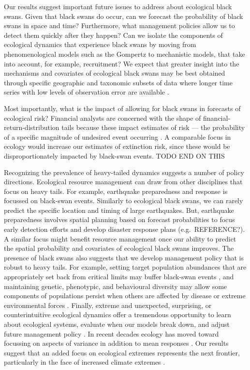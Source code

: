 Our results suggest important future issues to address about ecological black swans. Given that black swans do occur, can we forecast the probability of black swans in space and time? Furthermore, what management policies allow us to detect them quickly after they happen? Can we isolate the components of ecological dynamics that experience black swans by moving from phenomenological models such as the Gompertz to mechanistic models, that take into account, for example, recruitment? We expect that greater insight into the mechanisms and covariates of ecological black swans may be best obtained through specific geographic and taxonomic subsets of data where longer time series with low levels of observation error are available \citep[e.g.][]{segura2013}.

Most importantly, what is the impact of allowing for black swans in forecasts of ecological risk? Financial analysts are concerned with the shape of financial-return-distribution tails because these impact estimates of risk --- the probability of a specific magnitude of undesired event occurring \citep{rachev2008}. A comparable focus in ecology would increase our estimates of extinction risk, since these would be disproportionately impacted by black-swan events.
TODO END ON THIS

Recognizing the prevalence of heavy-tailed dynamics suggests a number of policy directions. Ecological resource management can draw from other disciplines that focus on heavy tails. For example, earthquake preparedness and response is focussed on black-swan events. Similarly to ecological black swans, we can rarely predict the specific location and timing of large earthquakes. But, earthquake preparedness involves spatial planning based on forecast probabilities to focus early detection efforts and develop disaster response plans (e.g.~REFERENCE?). A similar focus might benefit resource management once our ability to predict the spatial probability and covariates of ecological black swans improves. The presence of black swans also suggests that we develop management policy that is robust to heavy tails. For example, setting target population abundances that are appropriately set back from critical limits may buffer black-swan events \citep[e.g.][]{caddy1996}, and maintaining genetic, phenotypic, and behavioural diversity may allow some components of populations persist when others are affected by disease or extreme environmental forces \citep[e.g.][]{hilborn2003, schindler2010, anderson2014}. Finally, extreme and unexpected, surprising, or counterintuitive ecological dynamics offer a tremendous opportunity to learn about ecological systems, evaluate when our models break down, and adjust future management policy \citep{doak2008, pine-iii2009, lindenmayer2010}. In recent decades ecology has moved toward focussing on aspects of variance in addition to mean responses \citep[e.g.][]{loreau2010a, thompson2013}. Our results suggest that an added focus on ecological extremes represents the next frontier, particularly in the face of increased climate extremes \citep{meehl2004,ipcc2012}.

